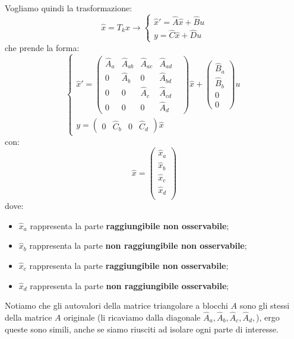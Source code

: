 \documentclass[a4paper,11pt]{article}
\begin{document}
Vogliamo quindi la trasformazione:
$$
\hat{x} = T_k x \rightarrow
\begin{cases}
	\hat{x}' = \hat{A} \hat{x} + \hat{B} u \\
	y = \hat{C} \hat{x} + \hat{D} u
\end{cases}
$$
che prende la forma:
\[
	\begin{cases}			
\hat{x}' = \begin{pmatrix}
	\hat{A}_a & \hat{A}_{ab} & \hat{A}_{ac} & \hat{A}_{ad} & \\
	0 & \hat{A}_b & 0 & \hat{A}_{bd} & \\
	0 & 0 & \hat{A}_c & \hat{A}_{cd} \\ 
	0 & 0 & 0 & \hat{A}_d
\end{pmatrix} \hat{x} + \begin{pmatrix}
	\hat{B}_a \\ \hat{B}_b \\ 0 \\ 0
\end{pmatrix} u \\
y = \begin{pmatrix}
	0 & \hat{C}_b & 0 & \hat{C}_d
\end{pmatrix} \hat{x}
	\end{cases}
\]
con:
$$
\hat{x} = \begin{pmatrix}
	\hat{x}_a \\ 
	\hat{x}_b \\ 
	\hat{x}_c \\ 
	\hat{x}_d \\ 
\end{pmatrix}
$$
dove:
\begin{itemize}
	\item $\hat{x}_a$ rappresenta la parte \textbf{raggiungibile non osservabile}; 
	\item $\hat{x}_b$ rappresenta la parte \textbf{non raggiungibile non osservabile}; 
	\item $\hat{x}_c$ rappresenta la parte \textbf{raggiungibile non osservabile}; 
	\item $\hat{x}_d$ rappresenta la parte \textbf{non raggiungibile osservabile}; 
\end{itemize}

Notiamo che gli autovalori della matrice triangolare a blocchi $A$ sono gli stessi della matrice $A$ originale (li ricaviamo dalla diagonale $\hat{A}_a, \hat{A}_b, \hat{A}_c, \hat{A}_d,$), ergo queste sono simili, anche se siamo riusciti ad isolare ogni parte di interesse.
\end{document}
